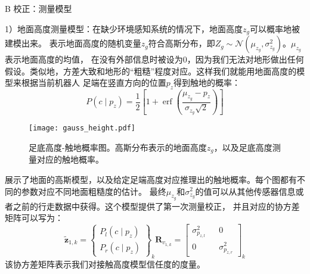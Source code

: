 B 校正：测量模型

1）地面高度测量模型：在缺少环境感知系统的情况下，地面高度$z_g$可以概率地被建模出来。
表示地面高度的随机变量$z_g$符合高斯分布，即$Z_g \sim \mathcal{N}\left(\mu_{z_g}, \sigma_{z_g}^2\right)$。$\mu_{z_g}$表示地面高度的均值，
在没有外部信息时被设为0，因为我们无法对地形做出任何假设。类似地，方差大致和地形的“粗糙”程度对应。这样我们就能用地面高度的模型来根据当前机器人
足端在竖直方向的位置$p_z$得到触地的概率：
\begin{equation}
    \label{equ:est_height_prob}
    P\left(c \mid p_z\right)=\frac{1}{2}\left[1+\operatorname{erf}\left(\frac{\mu_{z_g}-p_z}{\sigma_{z_g} \sqrt{2}}\right)\right]
\end{equation}
\begin{figure}[htbp]
    \centering
    \texttt{[image: gauss\_height.pdf]}
    \caption{\label{fig:gauss_height}足底高度-触地概率图。高斯分布表示的地面高度${{z}_{g}}$，以及足底高度测量对应的触地概率。}
\end{figure}
展示了地面的高斯模型，以及给定足端高度对应推理出的触地概率。每个图都有不同的参数对应不同地面粗糙度的估计。
最终$\mu_{z_g}$和$\sigma_{z_g}^2$的值可以从其他传感器信息或者之前的行走数据中获得。这个模型提供了第一次测量校正，
并且对应的协方差矩阵可以写为：
\begin{equation}
    \label{equ:est_height_noise}
    \tilde{\boldsymbol{z}}_{1, k}=\left\{\begin{array}{c}
        P_l\left(c \mid p_z\right) \\
        P_r\left(c \mid p_z\right)
        \end{array}\right\}_k \boldsymbol{R}_{v_{1, k}}=\left[\begin{array}{ccc}
        \sigma_{p_{z, l}}^2 & & 0 \\
        0 & & \sigma_{p_{z, r}}^2
        \end{array}\right]_k
\end{equation}
该协方差矩阵表示我们对接触高度模型信任度的度量。

